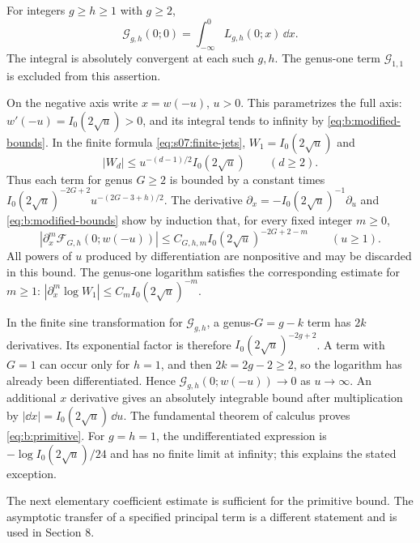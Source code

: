 \begin{lmm}\label{lmm:b:primitive}
For integers $g\geq h\geq1$ with $g\geq2$,
\begin{equation}\label{eq:b:primitive}
 \mathcal G_{g,h}(0;0)
                     =\int_{-\infty}^0 L_{g,h}(0;x)\,\dd x.
\end{equation}
The integral is absolutely convergent at each such $g,h$. The
genus-one term $\mathcal G_{1,1}$ is excluded from this assertion.
\end{lmm}
\begin{prf}
On the negative axis write $x=w(-u)$, $u>0$. This parametrizes
the full axis: $w'(-u)=I_0(2\sqrt u)>0$, and its integral tends
to infinity by \eqref{eq:b:modified-bounds}.
In the finite formula \eqref{eq:s07:finite-jets},
$W_1=I_0(2\sqrt u)$ and
\[
 |W_d|\leq u^{-(d-1)/2}I_0(2\sqrt u)\qquad(d\geq2).
\]
Thus each term for genus $G\geq2$ is bounded by a constant times
$I_0(2\sqrt u)^{-2G+2}u^{-(2G-3+h)/2}$.
The derivative $\partial_x=-I_0(2\sqrt u)^{-1}\partial_u$
and \eqref{eq:b:modified-bounds} show by induction that, for every
fixed integer $m\geq0$,
\[
 |\partial_x^m\mathcal F_{G,h}(0;w(-u))|
             \leq C_{G,h,m}I_0(2\sqrt u)^{-2G+2-m}
                         \qquad(u\geq1).
\]
All powers of $u$ produced by differentiation are nonpositive and
may be discarded in this bound. The genus-one logarithm satisfies
the corresponding estimate for $m\geq1$:
$|\partial_x^m\log W_1|\leq C_m I_0(2\sqrt u)^{-m}$.

In the finite sine transformation for $\mathcal G_{g,h}$, a
genus-$G=g-k$ term has $2k$ derivatives. Its exponential factor
is therefore $I_0(2\sqrt u)^{-2g+2}$. A term with $G=1$
can occur only for $h=1$, and then $2k=2g-2\geq2$, so the
logarithm has already been differentiated. Hence
$\mathcal G_{g,h}(0;w(-u))\to0$ as $u\to\infty$.
An additional $x$ derivative gives an absolutely integrable bound
after multiplication by $|\dd x|=I_0(2\sqrt u)\,\dd u$.
The fundamental theorem of calculus proves \eqref{eq:b:primitive}.
For $g=h=1$, the undifferentiated expression is
$-\log I_0(2\sqrt u)/24$ and has no finite limit at infinity;
this explains the stated exception.
\end{prf}

The next elementary coefficient estimate is sufficient for the
primitive bound. The asymptotic transfer of a specified principal
term is a different statement and is used in Section 8.


